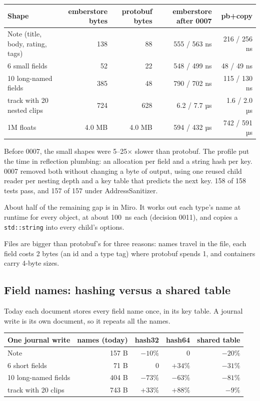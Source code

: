 \documentclass[11pt,a4paper]{article}
\newcommand{\code}[1]{\texttt{#1}}
\begin{document}
\begin{tabularx}{\textwidth}{@{}X r r r r@{}}
\toprule
Shape & emberstore bytes & protobuf bytes & emberstore after 0007 & pb+copy \\
\midrule
Note (title, body, rating, tags) & 138 & 88 & 555 / 563 ns & 216 / 256 ns \\
6 small fields & 52 & 22 & 548 / 499 ns & 48 / 49 ns \\
10 long-named fields & 385 & 48 & 790 / 702 ns & 115 / 130 ns \\
track with 20 nested clips & 724 & 628 & 6.2 / 7.7 µs & 1.6 / 2.0 µs \\
1M floats & 4.0 MB & 4.0 MB & 594 / 432 µs & 742 / 591 µs \\
\bottomrule
\end{tabularx}

Before 0007, the small shapes were 5--25$\times$ slower than protobuf. The profile put the time in reflection plumbing: an allocation per field and a string hash per key. 0007 removed both without changing a byte of output, using one reused child reader per nesting depth and a key table that predicts the next key. 158 of 158 tests pass, and 157 of 157 under AddressSanitizer.

About half of the remaining gap is in Miro. It works out each type's name at runtime for every object, at about 100~ns each (decision 0011), and copies a \code{std::string} into every child's options.

Files are bigger than protobuf's for three reasons: names travel in the file, each field costs 2 bytes (an id and a type tag) where protobuf spends 1, and containers carry 4-byte sizes.

\subsection{Field names: hashing versus a shared table}

Today each document stores every field name once, in its key table. A journal write is its own document, so it repeats all the names.

\begin{tabularx}{\textwidth}{@{}X r r r r@{}}
\toprule
One journal write & names (today) & hash32 & hash64 & shared table \\
\midrule
Note & 157 B & $-10\%$ & 0 & $-20\%$ \\
6 short fields & 71 B & 0 & $+34\%$ & $-31\%$ \\
10 long-named fields & 404 B & $-73\%$ & $-63\%$ & $-81\%$ \\
track with 20 clips & 743 B & $+33\%$ & $+88\%$ & $-9\%$ \\
\bottomrule
\end{tabularx}
\end{document}
